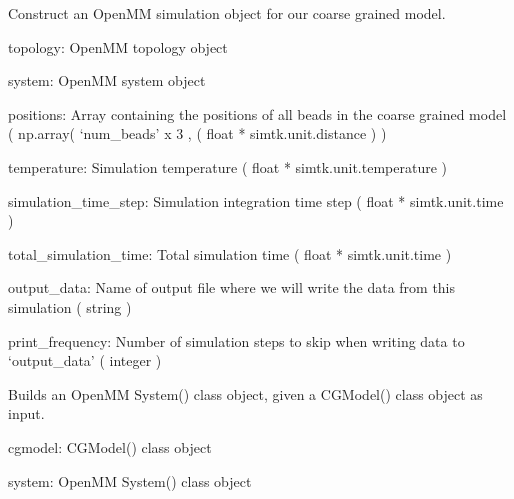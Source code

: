 \documentclass[letterpaper,12pt,english,openany,oneside]{sphinxmanual}
\begin{document}

\begin{fulllineitems}
\label{\detokenize{build:build.cg_build.build_mm_simulation}}
Construct an OpenMM simulation object for our coarse grained model.

topology: OpenMM topology object

system: OpenMM system object

positions: Array containing the positions of all beads
in the coarse grained model
( np.array( ‘num\_beads’ x 3 , ( float * simtk.unit.distance ) )

temperature: Simulation temperature ( float * simtk.unit.temperature )

simulation\_time\_step: Simulation integration time step
( float * simtk.unit.time )

total\_simulation\_time: Total simulation time ( float * simtk.unit.time )

output\_data: Name of output file where we will write the data from this
simulation ( string )

print\_frequency: Number of simulation steps to skip when writing data
to ‘output\_data’ ( integer )

\end{fulllineitems}


\begin{fulllineitems}
\label{\detokenize{build:build.cg_build.build_system}}
Builds an OpenMM System() class object, given a CGModel() class object as input.

cgmodel: CGModel() class object

system: OpenMM System() class object

\end{fulllineitems}
\end{document}
